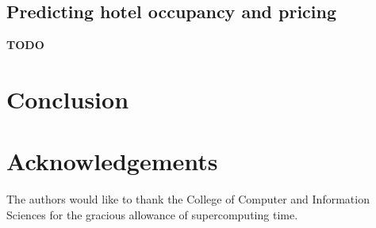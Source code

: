 \documentclass[useAMS, referee, usenatbib]{biom}
\begin{document}
\subsection{Predicting hotel occupancy and pricing}

\textbf{TODO}

\section{Conclusion}
\label{s:conclusion}

\backmatter

\section*{Acknowledgements}

The authors would like to thank the College of Computer and Information Sciences for the gracious allowance of supercomputing time.

 


\label{lastpage}
\end{document}
